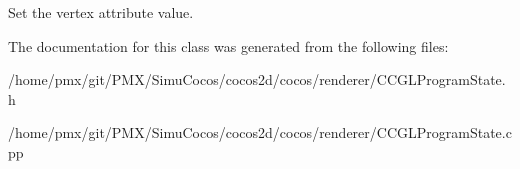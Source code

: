 Set the vertex attribute value. 

The documentation for this class was generated from the following files\+:\begin{DoxyCompactItemize}
\item 
/home/pmx/git/\+P\+M\+X/\+Simu\+Cocos/cocos2d/cocos/renderer/C\+C\+G\+L\+Program\+State.\+h\item 
/home/pmx/git/\+P\+M\+X/\+Simu\+Cocos/cocos2d/cocos/renderer/C\+C\+G\+L\+Program\+State.\+cpp\end{DoxyCompactItemize}
